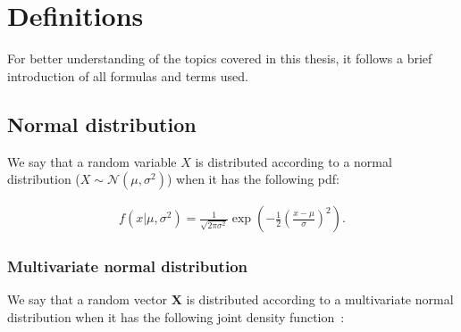 \chapter{Definitions}\label{ch:definitions}

For better understanding of the topics covered in this thesis,
it follows a brief introduction of all formulas and terms used.


\section{Normal distribution}\label{sec:normal-distribution}

We say that a random variable $X$ is distributed
according to a normal distribution ($X \sim \mathcal{N}(\mu, \sigma^2)$) when it has the following \gls{pdf}:

\begin{definition}
    \begin{align}
        \label{eq:pdf_normal_dist}
        f(x|\mu, \sigma^2) = \frac{1}{\sqrt{2\pi\sigma^2}}
        \exp{\left(-\frac{1}{2}\left(\frac{x-\mu}{\sigma}\right)^2\right)}.
    \end{align}
\end{definition}

\subsection{Multivariate normal distribution}\label{subsec:multivariate-normal-distribution}

We say that a random vector $\bm{X}$
is distributed according to a multivariate normal distribution
when it has the following joint density function~\autocite[p. 59]{izenman_modern_2008}:

